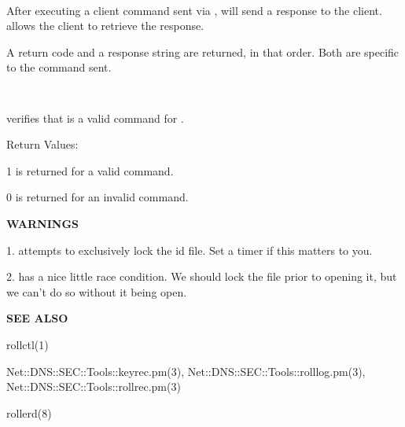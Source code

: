 \begin{description}
\item {}\verb" "

After executing a client command sent via ,
 will send a response to the client.  
allows the client to retrieve the response.

A return code and a response string are returned, in that order.  Both are
specific to the command sent.

\item {}\verb" "

 verifies that  is a valid command for
.

Return Values:

\begin{description}
\item 1 is returned for a valid command.
\item 0 is returned for an invalid command.
\end{description}

\end{description}

{\bf WARNINGS}

1.   attempts to exclusively lock the id file.
Set a timer if this matters to you.

2.   has a nice little race condition.  We should lock
the file prior to opening it, but we can't do so without it being open.

{\bf SEE ALSO}

rollctl(1)

Net::DNS::SEC::Tools::keyrec.pm(3),
Net::DNS::SEC::Tools::rolllog.pm(3), \\
Net::DNS::SEC::Tools::rollrec.pm(3)

rollerd(8)

